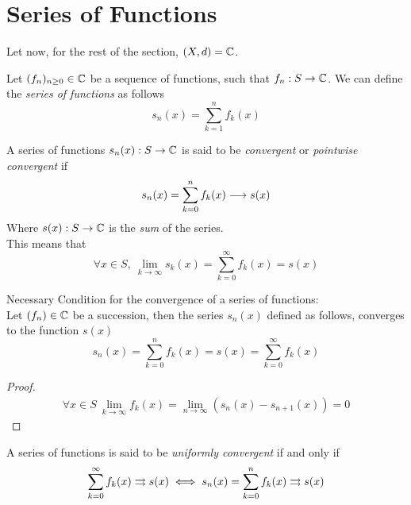 \documentclass[../complete.tex]{subfiles}
\begin{document}
\section{Series of Functions}
Let now, for the rest of the section, $(X,d)=\mathbb{C}$.
\begin{dfn}
	Let $(f_n)_{n\ge0}\in\mathbb{C}$ be a sequence of functions, such that $f_n:S\to\mathbb{C}$. We can define the \textit{series of functions} as follows
	\begin{equation}
		s_n(x)=\sum_{k=1}^nf_k(x)
		\label{eq:seriesdef}
	\end{equation}
\end{dfn}
\begin{dfn}
	A series of functions $s_n(x):S\to\mathbb{C}$ is said to be \textit{convergent} or \textit{pointwise convergent} if
	\begin{equation}
		s_n(x)=\sum_{k=0}^nf_k(x)\overset{}{\longrightarrow} s(x)
		\label{eq:serconv}
	\end{equation}
	Where $s(x):S\to\mathbb{C}$ is the \textit{sum} of the series.\\
	This means that
	\begin{equation}
		\forall x\in S,\ \lim_{k\to\infty}s_k(x)=\sum_{k=0}^\infty f_k(x)=s(x)
	\end{equation}
\end{dfn}
\begin{thm}
	Necessary Condition for the convergence of a series of functions:\\
	Let $(f_n)\in\mathbb{C}$ be a succession, then the series $s_n(x)$ defined as follows, converges to the function $s(x)$
	\begin{equation*}
		s_n(x)=\sum_{k=0}^nf_k(x)=s(x)=\sum_{k=0}^\infty f_k(x)
	\end{equation*}
\end{thm}
\begin{proof}
	\begin{equation*}
		\begin{aligned}
			\forall x\in S\ \lim_{k\to\infty}f_k(x)=\lim_{n\to\infty}\left( s_n(x)-s_{n+1}(x) \right)=0
		\end{aligned}
	\end{equation*}
\end{proof}
\begin{dfn}
	A series of functions is said to be \textit{uniformly convergent} if and only if
	\begin{equation}
		\sum_{k=0}^\infty f_k(x)\rightrightarrows s(x)\iff s_n(x)=\sum_{k=0}^nf_k(x)\rightrightarrows s(x)
		\label{eq:uniformconvser}
	\end{equation}
\end{dfn}
\end{document}
